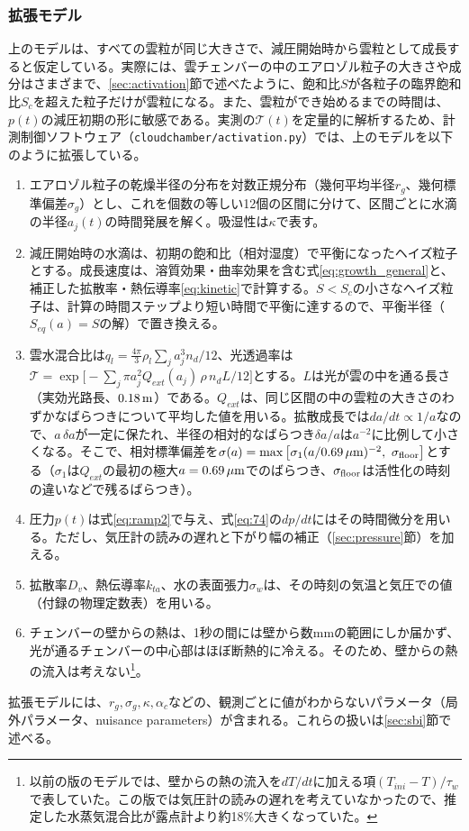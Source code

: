 \documentclass{ltjsarticle}
\begin{document}
\subsubsection{拡張モデル}\label{sec:extended}
上のモデルは、すべての雲粒が同じ大きさで、減圧開始時から雲粒として成長すると仮定している。実際には、雲チェンバーの中のエアロゾル粒子の大きさや成分はさまざまで、\ref{sec:activation}節で述べたように、飽和比$S$が各粒子の臨界飽和比$S_{c}$を超えた粒子だけが雲粒になる。また、雲粒ができ始めるまでの時間は、$p(t)$の減圧初期の形に敏感である。実測の$\mathcal{T}(t)$を定量的に解析するため、計測制御ソフトウェア（\verb|cloudchamber/activation.py|）では、上のモデルを以下のように拡張している。
\begin{enumerate}
\item エアロゾル粒子の乾燥半径の分布を対数正規分布（幾何平均半径$r_{g}$、幾何標準偏差$\sigma_{g}$）とし、これを個数の等しい12個の区間に分けて、区間ごとに水滴の半径$a_{j}(t)$の時間発展を解く。吸湿性は$\kappa$で表す。
\item 減圧開始時の水滴は、初期の飽和比（相対湿度）で平衡になったヘイズ粒子とする。成長速度は、溶質効果・曲率効果を含む式\eqref{eq:growth_general}と、補正した拡散率・熱伝導率\eqref{eq:kinetic}で計算する。$S<S_{c}$の小さなヘイズ粒子は、計算の時間ステップより短い時間で平衡に達するので、平衡半径（$S_{eq}(a)=S$の解）で置き換える。
\item 雲水混合比は$q_{l}=\frac{4\pi}{3}\rho_{l}\sum_{j}a_{j}^{3}n_{d}/12$、光透過率は$\mathcal{T}=\exp{\big [}-\sum_{j}\pi a_{j}^{2}Q_{ext}(a_{j})\,\rho\, n_{d} L/12{\big ]}$とする。$L$は光が雲の中を通る長さ（実効光路長、$0.18\,\rm m$）である。$Q_{ext}$は、同じ区間の中の雲粒の大きさのわずかなばらつきについて平均した値を用いる。拡散成長では$da/dt\propto1/a$なので、$a\,\delta a$が一定に保たれ、半径の相対的なばらつき$\delta a/a$は$a^{-2}$に比例して小さくなる。そこで、相対標準偏差を$\sigma(a)=\max\left[\sigma_{1}(a/0.69\,{\rm \mu m})^{-2},\ \sigma_{\rm floor}\right]$とする（$\sigma_{1}$は$Q_{ext}$の最初の極大$a=0.69\,\rm \mu m$でのばらつき、$\sigma_{\rm floor}$は活性化の時刻の違いなどで残るばらつき）。
\item 圧力$p(t)$は式\eqref{eq:ramp2}で与え、式\eqref{eq:74}の$dp/dt$にはその時間微分を用いる。ただし、気圧計の読みの遅れと下がり幅の補正（\ref{sec:pressure}節）を加える。
\item 拡散率$D_{v}$、熱伝導率$k_{ta}$、水の表面張力$\sigma_{w}$は、その時刻の気温と気圧での値（付録の物理定数表）を用いる。
\item チェンバーの壁からの熱は、1秒の間には壁から数mmの範囲にしか届かず、光が通るチェンバーの中心部はほぼ断熱的に冷える。そのため、壁からの熱の流入は考えない\footnote{以前の版のモデルでは、壁からの熱の流入を$dT/dt$に加える項$(T_{ini}-T)/\tau_{w}$で表していた。この版では気圧計の読みの遅れを考えていなかったので、推定した水蒸気混合比が露点計より約18\%大きくなっていた。}。
\end{enumerate}
拡張モデルには、$r_{g},\sigma_{g},\kappa,\alpha_{c}$などの、観測ごとに値がわからないパラメータ（局外パラメータ、nuisance parameters）が含まれる。これらの扱いは\ref{sec:sbi}節で述べる。
\end{document}
